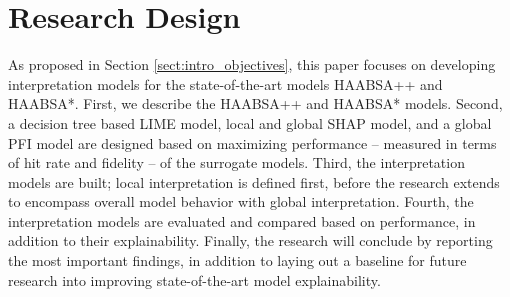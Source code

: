 \chapter{Research Design}
    \label{chap:research_design}
As proposed in Section \ref{sect:intro_objectives}, this paper focuses on developing interpretation models for the state-of-the-art models HAABSA++ and HAABSA*. First, we describe the HAABSA++ and HAABSA* models. Second, a decision tree based LIME model, local and global SHAP model, and a global PFI model are designed based on maximizing performance -- measured in terms of hit rate and fidelity -- of the surrogate models. Third, the interpretation models are built; local interpretation is defined first, before the research extends to encompass overall model behavior with global interpretation. Fourth, the interpretation models are evaluated and compared based on performance, in addition to their explainability. Finally, the research will conclude by reporting the most important findings, in addition to laying out a baseline for future research into improving state-of-the-art model explainability.
